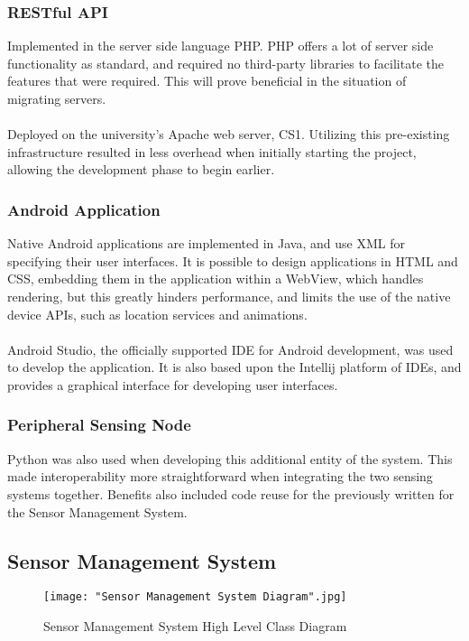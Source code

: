 \documentclass{article}
\begin{document}
\subsubsection{RESTful API}
Implemented in the server side language PHP. PHP offers a lot of server side functionality as standard, and required no third-party libraries to facilitate the features that were required. This will prove beneficial in the situation of migrating servers. \\\\ Deployed on the university’s Apache web server, CS1. Utilizing this pre-existing infrastructure resulted in less overhead when initially starting the project, allowing the development phase to begin earlier. 

\subsubsection{Android Application}
Native Android applications are implemented in Java, and use XML for specifying their user interfaces. It is possible to design applications in HTML and CSS, embedding them in the application within a WebView, which handles rendering, but this greatly hinders performance, and limits the use of the native device APIs, such as location services and animations. \\\\ Android Studio, the officially supported IDE for Android development, was used to develop the application. It is also based upon the Intellij platform of IDEs, and provides a graphical interface for developing user interfaces.  

\subsubsection{Peripheral Sensing Node}
Python was also used when developing this additional entity of the system. This made interoperability more straightforward when integrating the two sensing systems together. Benefits also included code reuse for the previously written for the Sensor Management System. 

\newpage
\subsection{Sensor Management System}

\begin{figure}[H]
\centering
\texttt{[image: "Sensor Management System Diagram".jpg]}
\caption{Sensor Management System High Level Class Diagram\label{overflow}}
\label{fig:sms_high_level_arch}
\end{figure}
\end{document}
